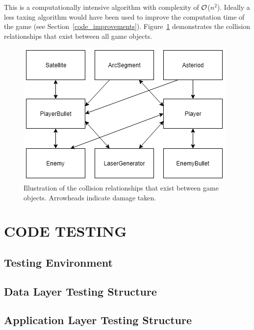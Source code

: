 \documentclass[10pt,twocolumn]{witseiepaper}
\begin{document}
This is a computationally intensive algorithm with complexity of $\cal{O}$($n^{2}$). Ideally a less taxing algorithm would have been used to improve the computation time of the game (see Section~\ref{code_improvements}). Figure~\ref{fig:collisions} demonstrates the collision relationships that exist between all game objects.

\begin{figure}[H]
	\centering
	\includegraphics[width=0.9\columnwidth]{collisions.png}
	\caption{Illustration of the collision relationships that exist between game objects. Arrowheads indicate damage taken.}
	\raggedright
	\label{fig:collisions}
\end{figure}


\section{CODE TESTING}

\subsection{Testing Environment}

\subsection{Data Layer Testing Structure}

\subsection{Application Layer Testing Structure}

\end{document}
